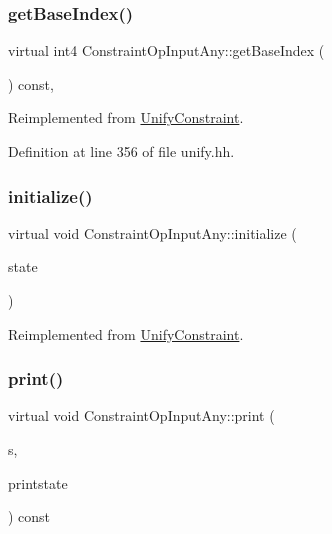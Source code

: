 \subsubsection{\texorpdfstring{getBaseIndex()}{getBaseIndex()}}
{\footnotesize\ttfamily virtual int4 Constraint\+Op\+Input\+Any\+::get\+Base\+Index (\begin{DoxyParamCaption}\item[{void}]{ }\end{DoxyParamCaption}) const\hspace{0.3cm}{\ttfamily [inline]}, {\ttfamily [virtual]}}



Reimplemented from \mbox{\hyperlink{class_unify_constraint_a44f0164f38ac1fdc44fc73ebe7678de1}{Unify\+Constraint}}.



Definition at line 356 of file unify.\+hh.

\mbox{\label{class_constraint_op_input_any_a819bcdb6da490558ba92e918090ea3e8}} 
\subsubsection{\texorpdfstring{initialize()}{initialize()}}
{\footnotesize\ttfamily virtual void Constraint\+Op\+Input\+Any\+::initialize (\begin{DoxyParamCaption}\item[{\mbox{\hyperlink{class_unify_state}{Unify\+State}} \&}]{state }\end{DoxyParamCaption})\hspace{0.3cm}{\ttfamily [virtual]}}



Reimplemented from \mbox{\hyperlink{class_unify_constraint_ac812e2cf68c95e8a5c0e7e8ac02f2fc2}{Unify\+Constraint}}.

\mbox{\label{class_constraint_op_input_any_ac2bd9bf9659cc33f50c42c56e6f2eb6e}} 
\subsubsection{\texorpdfstring{print()}{print()}}
{\footnotesize\ttfamily virtual void Constraint\+Op\+Input\+Any\+::print (\begin{DoxyParamCaption}\item[{ostream \&}]{s,  }\item[{\mbox{\hyperlink{class_unify_c_printer}{Unify\+C\+Printer}} \&}]{printstate }\end{DoxyParamCaption}) const\hspace{0.3cm}{\ttfamily [virtual]}}



